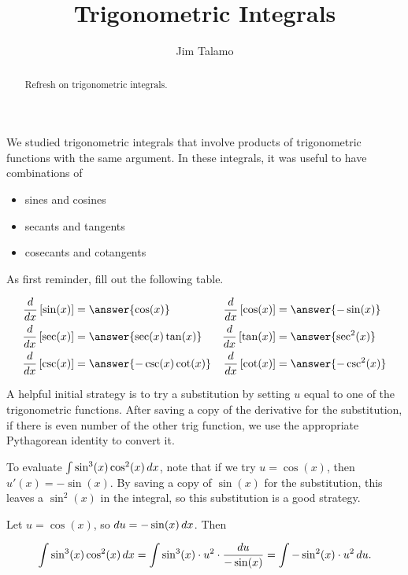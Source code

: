 \documentclass{ximera}
\title[Refresh:]{Trigonometric Integrals}
\author{Jim Talamo}
\begin{document}
\begin{abstract}
 Refresh on trigonometric integrals.
\end{abstract}
\maketitle


\begin{exercise}

We studied trigonometric integrals that involve products of trigonometric functions with the same argument.  In these integrals, it was useful to have combinations of 

\begin{itemize}
\item sines and cosines
\item secants and tangents
\item cosecants and cotangents
\end{itemize}

As first reminder, fill out the following table.

\begin{align*}
\frac{d}{dx}\left[\sin(x)\right] & = \answer{\cos(x)} & \frac{d}{dx}\left[\cos(x)\right] & = \answer{-\sin(x)} \\
\frac{d}{dx}\left[\sec(x)\right] & = \answer{\sec(x)\tan(x)} & \frac{d}{dx}\left[\tan(x)\right] & = \answer{\sec^2(x)} \\
\frac{d}{dx}\left[\csc(x)\right] & = \answer{-\csc(x)\cot(x)} & \frac{d}{dx}\left[\cot(x)\right] & = \answer{-\csc^2(x)} 
\end{align*}

A helpful initial strategy is to try a substitution by setting $u$ equal to one of the trigonometric functions.  After saving a copy of the derivative for the substitution, if there is even number of the other trig function, we use the appropriate Pythagorean identity to convert it.

\begin{example}
To evaluate $\int \sin^3(x) \cos^2(x) \mathop{}\!d x$, note that if we try $u=\cos(x)$, then $u'(x) = -\sin(x)$.  By saving a copy of $\sin(x)$ for the substitution, this leaves a $\sin^2(x)$ in the integral, so this substitution is a good strategy.

Let $u = \cos(x)$, so $\mathop{}\!d u = - \sin(x) \mathop{}\!d x$.  Then

\[
\int \sin^3(x) \cos^2(x) \mathop{}\!d x = \int \sin^3(x) \cdot u^2 \cdot  \frac{\mathop{}\!d u}{-\sin(x)} = \int -\sin^2(x) \cdot u^2 \mathop{}\!d u.
\]


\end{example}
\end{exercise}
\end{document}
